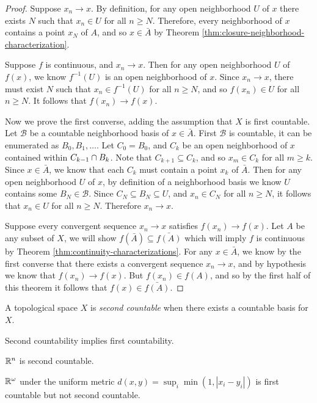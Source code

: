 \begin{proof}
    Suppose $x_n \to x$. By definition, for any open neighborhood $U$ of $x$ there exists $N$ such that $x_n \in U$ for all $n \geq N$. Therefore, every neighborhood of $x$ contains a point $x_N$ of $A$, and so $x \in \bar{A}$ by Theorem \ref{thm:closure-neighborhood-characterization}.

    Suppose $f$ is continuous, and $x_n \to x$. Then for any open neighborhood $U$ of $f(x)$, we know $f^{-1}(U)$ is an open neighborhood of $x$. Since $x_n \to x$, there must exist $N$ such that $x_n \in f^{-1}(U)$ for all $n \geq N$, and so $f(x_n) \in U$ for all $n \geq N$. It follows that $f(x_n) \to f(x)$.

    Now we prove the first converse, adding the assumption that $X$ is first countable. Let $\mathcal{B}$ be a countable neighborhood basis of $x \in \bar{A}$. First $\mathcal{B}$ is countable, it can be enumerated as $B_0, B_1, \ldots$. Let $C_0 = B_0$, and $C_k$ be an open neighborhood of $x$ contained within $C_{k-1} \cap B_k$. Note that $C_{k+1} \subseteq C_k$, and so $x_m \in C_k$ for all $m \geq k$. Since $x \in \bar{A}$, we know that each $C_k$ must contain a point $x_k$ of $\bar{A}$. Then for any open neighborhood $U$ of $x$, by definition of a neighborhood basis we know $U$ contains some $B_N \in \mathcal{B}$. Since $C_N \subseteq B_N \subseteq U$, and $x_n \in C_N$ for all $n \geq N$, it follows that $x_n \in U$ for all $n \geq N$. Therefore $x_n \to x$.

    Suppose every convergent sequence $x_n \to x$ satisfies $f(x_n) \to f(x)$. Let $A$ be any subset of $X$, we will show $f(\bar{A}) \subseteq \bar{f(A)}$ which will imply $f$ is continuous by Theorem \ref{thm:continuity-characterizations}. For any $x \in \bar{A}$, we know by the first converse that there exists a convergent sequence $x_n \to x$, and by hypothesis we know that $f(x_n) \to f(x)$. But $f(x_n) \in f(A)$, and so by the first half of this theorem it follows that $f(x) \in \bar{f(A)}$.
\end{proof}

\begin{defn}
    A topological space $X$ is \emph{second countable} when there exists a countable basis for $X$.
\end{defn}

\begin{prop}
    Second countability implies first countability.
\end{prop}

\begin{exmp}
    $\mathbb{R}^n$ is second countable.

    $\mathbb{R}^{\omega}$ under the uniform metric $d(x, y) = \sup_{i}\min(1, |x_i-y_i|)$ is first countable but not second countable.
\end{exmp}

